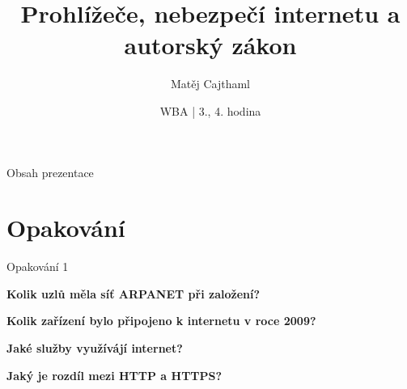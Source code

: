\documentclass[aspectratio=1610]{beamer}
\title{Prohlížeče, nebezpečí internetu a autorský zákon}
\date{WBA | 3., 4. hodina}
\author[Cajthaml]{Matěj Cajthaml}
\begin{document}
\begin{frame}
\titlepage
\end{frame}

\begin{frame}{Obsah prezentace}
    \begin{cardTiny}
        \begin{minipage}{\textwidth}
            \vspace{1ex}
            \tableofcontents
        \end{minipage}
    \end{cardTiny}
\end{frame}



\section{Opakování}

\begin{frame}{Opakování 1}
    \begin{cardTiny}
        \begin{center}
            \textbf{Kolik uzlů měla síť ARPANET při založení?}
        \end{center}
    \end{cardTiny}
    \begin{cardTiny}
        \begin{center}
            \textbf{Kolik zařízení bylo připojeno k internetu v roce 2009?}
        \end{center}
    \end{cardTiny}
       
    \begin{cardTiny}
        \begin{center}
            \textbf{Jaké služby využívájí internet?}
        \end{center}
    \end{cardTiny} 
    \begin{cardTiny}
        \begin{center}
            \textbf{Jaký je rozdíl mezi HTTP a HTTPS?}
        \end{center}
    \end{cardTiny}
\end{frame}
\end{document}
